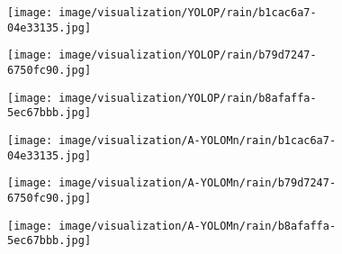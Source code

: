 \documentclass[lettersize,journal]{IEEEtran}
\begin{document}
\begin{figure*}[!h]
    \centering
    
    \begin{subfigure}[b]{0.05\textwidth}
            \centering
            \vspace{0.6cm} 
    \end{subfigure}\begin{subfigure}{0.25\textwidth}
        \centering
        \texttt{[image: image/visualization/YOLOP/rain/b1cac6a7-04e33135.jpg]}
    \end{subfigure}\hspace{0.5cm}
    \begin{subfigure}{0.25\textwidth}
        \centering
        \texttt{[image: image/visualization/YOLOP/rain/b79d7247-6750fc90.jpg]}
    \end{subfigure}\hspace{0.5cm}
    \begin{subfigure}{0.25\textwidth}
        \centering
        \texttt{[image: image/visualization/YOLOP/rain/b8afaffa-5ec67bbb.jpg]}
    \end{subfigure}
    
    \medskip
    \begin{subfigure}[b]{0.05\textwidth}
        \centering
        \vspace{0.2cm}
    \end{subfigure}\begin{subfigure}{0.25\textwidth}
        \centering
        \texttt{[image: image/visualization/A-YOLOMn/rain/b1cac6a7-04e33135.jpg]}
    \end{subfigure}\hspace{0.5cm}
    \begin{subfigure}{0.25\textwidth}
        \centering
        \texttt{[image: image/visualization/A-YOLOMn/rain/b79d7247-6750fc90.jpg]}
    \end{subfigure}\hspace{0.5cm}
    \begin{subfigure}{0.25\textwidth}
        \centering
        \texttt{[image: image/visualization/A-YOLOMn/rain/b8afaffa-5ec67bbb.jpg]}
    \end{subfigure}

    \medskip
    

\end{figure*}
\end{document}
